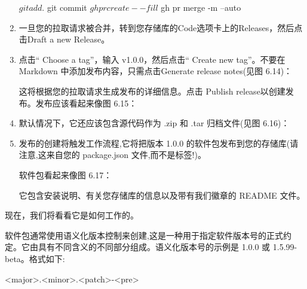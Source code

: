 \begin{enumerate}
\begin{shell}
$ git add .
$ git commit
$ gh pr create --fill
$ gh pr merge -m --auto
\end{shell}

\item 
一旦您的拉取请求被合并，转到您存储库的Code选项卡上的Releases，然后点击Draft a new Release。

\item 
点击“ Choose a tag”，输入 v1.0.0，然后点击“ Create new tag”。不要在 Markdown 中添加发布内容，只需点击Generate release notes(见图 6.14)：


这将根据您的拉取请求生成发布的详细信息。点击 Publish release以创建发布。发布应该看起来像图 6.15：


\item 
默认情况下，它还应该包含源代码作为 .zip 和 .tar 归档文件(见图 6.16)：


\item 
发布的创建将触发工作流程,它将把版本 1.0.0 的软件包发布到您的存储库(请注意,这来自您的 package.json 文件,而不是标签!)。

软件包看起来像图 6.17：


它包含安装说明、有关您存储库的信息以及带有我们徽章的 README 文件。

\end{enumerate}


现在，我们将看看它是如何工作的。


软件包通常使用语义化版本控制来创建,这是一种用于指定软件版本号的正式约定。它由具有不同含义的不同部分组成。语义化版本号的示例是 1.0.0 或 1.5.99-beta。格式如下:

\begin{shell}
<major>.<minor>.<patch>-<pre>
\end{shell}

